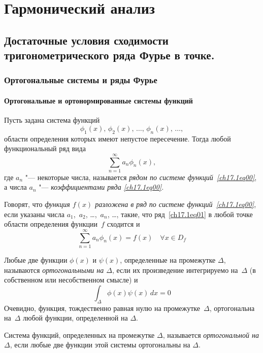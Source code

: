 \part[Гармонический анализ]{Гармонический анализ}

\chapter{Достаточные условия сходимости тригонометрического ряда Фурье в точке.}\label{chapter17}
\section{Ортогональные системы и ряды Фурье}
\subsection{Ортогональные и ортонормированные системы функций}
Пусть задана система функций 
\begin{equation} \label{ch17.1eq00}
\phi_1(x),\, \phi_2(x),\, \ldots,\, \phi_n(x),\, \ldots,
\end{equation}
области определения которых имеют непустое пересечение. Тогда любой функциональный ряд вида
\begin{equation} \label{ch17.1eq01}
\sum_{n = 1}^{\infty} a_n \phi_n(x),
\end{equation}
где $a_n$ "--- некоторые числа, называется \textit{рядом по системе функций~\eqref{ch17.1eq00}}, а числа $a_n$ "--- \textit{коэффициентами ряда \eqref{ch17.1eq00}.}

Говорят, что \textit{функция $f(x)$ разложена в ряд по системе функций~\eqref{ch17.1eq00}}, если указаны числа $a_1$,~$a_2$, \dots,~$a_n$, \dots, такие, что ряд~\eqref{ch17.1eq01} в любой точке области определения функции~$f$ сходится и 
$$
\sum_{n = 1}^{\infty} a_n \phi_n(x)=f(x) \quad \forall x \in D_f
$$ 

\begin{defn}
Любые две функции $\phi(x)$	и $\psi(x)$, определенные на промежутке $\Delta$, называются \textit{ортогональными на $\Delta$}, если их произведение интегрируемо на~$\Delta$ (в собственном или несобственном смысле) и
$$
\int_\Delta\phi(x) \psi(x)\,dx=0
$$
Очевидно, функция, тождественно равная нулю на промежутке~$\Delta$, ортогональна на~$\Delta$ любой функции, определенной на $\Delta$.
\end{defn}

\begin{defn}
Система функций, определенных на промежутке $\Delta$, называется \textit{ортогональной на $\Delta$}, если любые две функции этой системы ортогональны на $\Delta$.
\end{defn}

